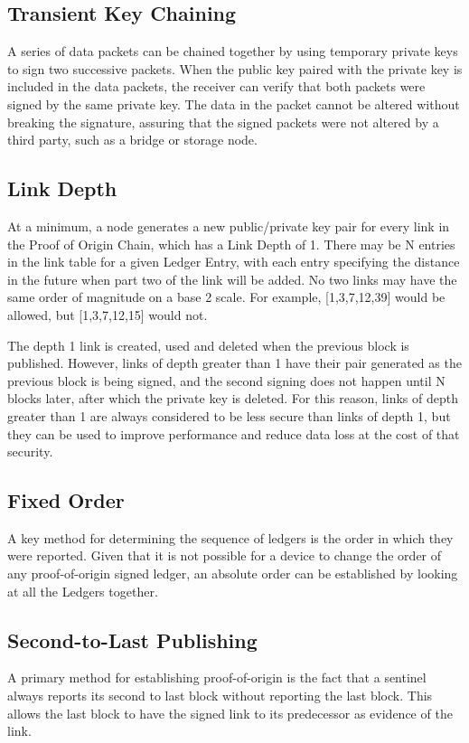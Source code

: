 \documentclass{article}
\begin{document}
\subsection {Transient Key Chaining}
A series of data packets can be chained together by using temporary private keys to sign two successive packets. When the public key paired with the private key is included in the data packets, the receiver can verify that both packets were signed by the same private key. The data in the packet cannot be altered without breaking the signature, assuring that the signed packets were not altered by a third party, such as a \gls{bridge} or storage node.

\subsection {Link Depth}
At a minimum, a node generates a new public/private key pair for every link in the Proof of Origin Chain, which has a Link Depth of 1. There may be N entries in the link table for a given Ledger Entry, with each entry specifying the distance in the future when part two of the link will be added. No two links may have the same order of magnitude on a base 2 scale. For example, [1,3,7,12,39] would be allowed, but [1,3,7,12,15] would not.

The depth 1 link is created, used and deleted when the previous block is published. However, links of depth greater than 1 have their pair generated as the previous block is being signed, and the second signing does not happen until N blocks later, after which the private key is deleted. For this reason, links of depth greater than 1 are always considered to be less secure than links of depth 1, but they can be used to improve performance and reduce data loss at the cost of that security.

\subsection {Fixed Order}
A key method for determining the sequence of ledgers is the order in which they were reported. Given that it is not possible for a device to change the order of any \Gls{proof-of-origin} signed ledger, an absolute order can be established by looking at all the Ledgers together.

\subsection {Second-to-Last Publishing}
A primary method for establishing \Gls{proof-of-origin} is the fact that a \Gls{sentinel} always reports its second to last block without reporting the last block. This allows the last block to have the signed link to its predecessor as evidence of the link.
\end{document}
